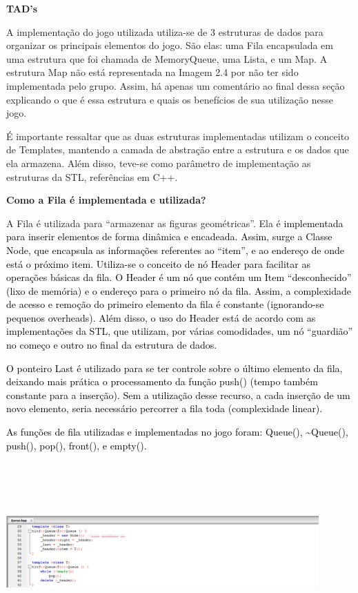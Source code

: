 \documentclass[a4paper]{article}
\newcounter{Imagem2}
\newcounter{Imagem1}
\begin{document}
\bigskip

\textbf{TAD’s}

A implementação do jogo utilizada utiliza-se de 3 estruturas de dados
para organizar os principais elementos do jogo. São elas: uma Fila
encapsulada em uma estrutura que foi chamada de MemoryQueue, uma Lista,
e um Map. A estrutura Map não está representada na Imagem 2.4 por não
ter sido implementada pelo grupo. Assim, há apenas um comentário ao
final dessa seção explicando o que é essa estrutura e quais os
benefícios de sua utilização nesse jogo.

É importante ressaltar que as duas estruturas implementadas utilizam o
conceito de Templates, mantendo a camada de abstração entre a estrutura
e os dados que ela armazena. Além disso, teve-se como parâmetro de
implementação as estruturas da STL, referências em C++.

\textbf{Como a Fila é implementada e utilizada?}

A Fila é utilizada para “armazenar as figuras geométricas”. Ela
é\textcolor{black}{ implementada para inserir elementos de forma
dinâmica e encadeada. Assim, surge a Classe Node, que encapsula as
informações referentes ao “item”, e ao endereço de onde está o próximo
item. Utiliza-se o conceito de nó Header para facilitar as operações
básicas da fila. O Header é um nó que contém um Item “desconhecido”
(lixo de memória) e o endereço para o primeiro nó da fila. Assim, a
complexidade de acesso e remoção do primeiro elemento da fila é
constante (ignorando-se pequenos overheads). Além disso, o uso do
Header está de acordo com as implementações da STL, que utilizam, por
várias comodidades, um nó “guardião” no começo e outro no final da
estrutura de dados.}

\textcolor{black}{O ponteiro Last é utilizado para se ter controle sobre
o último elemento da fila, deixando mais prática o processamento da
função push() (tempo também constante para a inserção). Sem a
utilização desse recurso, a cada inserção de um novo elemento, seria
necessário percorrer a fila toda (complexidade linear). }

\textcolor{black}{As funções de fila utilizadas e implementadas no jogo
foram: Queue(), \~{}Queue(), push(), pop(), front(), e empty().}

{\centering 
\includegraphics[width=4.7209in,height=2.7083in]{T1-img11.png} \par}
\end{document}

